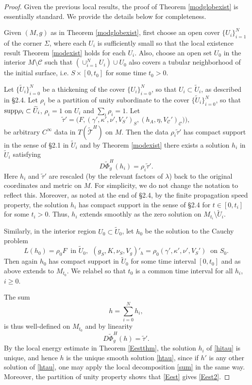 \documentclass[10pt]{amsart}
\newcommand{\g}{\gamma}
\newcommand{\Si}{\Sigma}
\renewcommand{\k}{\kappa}
\renewcommand{\l}{\lambda}
\newcommand{\cC}{{\mathcal C}}
\newcommand{\cT}{{\mathcal T}}
\newcommand{\be}{\begin{equation}}
\newcommand{\ee}{\end{equation}}
\newcommand{\<}{\langle}
\renewcommand{\>}{\rangle}
\newcommand{\w}{\widetilde}
\theoremstyle{plain}
\theoremstyle{remark}
\theoremstyle{definition}
\numberwithin{equation}{section}
\begin{document}
 \begin{proof}

  Given the previous local results, the proof of Theorem \ref{modglobexist} is essentially standard. We provide the details below for completeness. 
    
  Given $(M, g)$ as in Theorem \ref{modglobexist}, first choose an open cover $\{U_i\}_{i=1}^N$ of the corner $\Si$, where each $U_i$ is sufficiently 
small so that the local existence result Theorem \ref{modexist} holds for each $U_i$. Also, choose an open set $U_0$ in the interior $M\setminus \cC$ 
such that $(\cup_{i=1}^N U_i)\cup U_0$ also covers a tubular neighborhood of the initial surface, i.e. $S\times [0,t_0]$ for some time $t_0>0$.

Let $\{\w U_i\}_{i=0}^N$ be a thickening of the cover $\{U_i\}_{i=0}^N$, so that $U_i \subset \w U_i$, as described in \S 2.4. Let 
$\rho_i$ be a partition of unity subordinate to the cover $\{\w U_i\}_{i=0}^N$, so that ${\rm supp}\rho_i\subset \w U_i$, $\rho_i = 1$ on 
$U_i$ and  $\sum_i \rho_i=1$. Let 
$$\w \tau' =\big(F, (\g', \k', \nu', V_S')_S, (h_A, \eta,V_{\cC}')_{\cC} )\big),$$
be arbitrary $C^{\infty}$ data in $T(\w \cT^H)$ on $M$. Then the data $\rho_i \w \tau'$ has compact support in the sense of \S 2.1 in $\w U_i$ 
and by Theorem \ref{modexist} there exists a solution $h_i$ in $\w U_i$ satisfying 
\be \label{hitau}
D\w \Phi^H_g(h_i) = \rho_i \w \tau'. 
\ee
Here $h_i$ and $\w \tau'$ are rescaled (by the relevant factors of $\l$) back to the original coordinates and metric on $M$. For simplicity, we do not 
change the notation to reflect this. Moreover, as noted at the end of \S 2.4, by the finite propagation 
speed property, the solution $h_i$ has compact support in the sense of \S 2.4 for $t \in [0,t_i]$ for some $t_i > 0$. Thus, $h_i$ extends smoothly as the 
zero solution on $M_{t_i} \setminus \w U_i$. 

   Similarly, in the interior region $U_0 \subset \w U_0$, let $h_0$ be the solution to the Cauchy problem 
$$L(h_0) = \rho_0 F \ \mbox{ in } \w U_0, \ \ (g_S, K, \nu_S, V_g)'_h = \rho_0(\g', \k', \nu', V_S') \ \mbox{ on }S_0.$$
Then again $h_0$ has compact support in $\w U_0$ for some time interval $[0, t_0]$ and as above extends to $M_{t_0}$. We relabel so that 
$t_0$ is a common time interval for all $h_i$, $i \geq 0$. 

  The sum 
\be \label{sum}
h = \sum_{i=0}^N h_i,
\ee
is thus well-defined on $M_{t_0}$ and by linearity
\be \label{htau}
D\w \Phi_g^H(h) = \w \tau'.
\ee
By the local energy estimate in Theorem \ref{Eestthm}, the solution $h_i$ of \eqref{hitau} is 
unique, and hence $h$ is the unique smooth solution \eqref{htau}, since if $h'$ is any other solution of \eqref{htau}, one may apply the local decomposition 
\eqref{sum} in the same way. Moreover, the partition of unity property shows that \eqref{Eest} gives \eqref{Eest2}. 


\end{proof}
\end{document}
